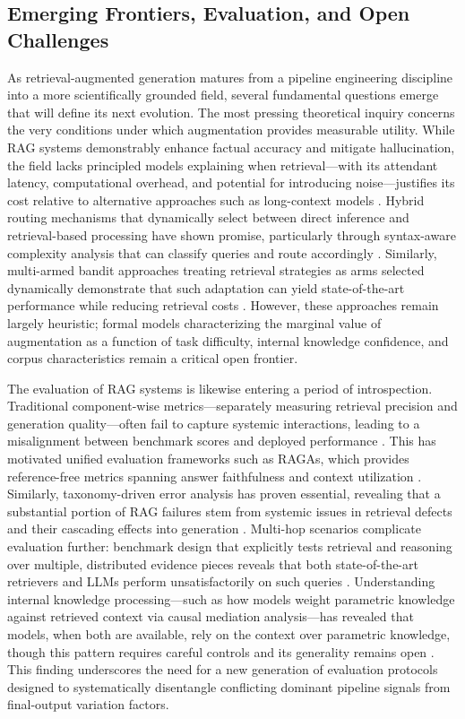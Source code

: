 \documentclass[11pt,a4paper]{article}
\begin{document}
\subsection{Emerging Frontiers, Evaluation, and Open Challenges}


As retrieval-augmented generation matures from a pipeline engineering discipline into a more scientifically grounded field, several fundamental questions emerge that will define its next evolution. The most pressing theoretical inquiry concerns the very conditions under which augmentation provides measurable utility. While RAG systems demonstrably enhance factual accuracy and mitigate hallucination, the field lacks principled models explaining when retrieval---with its attendant latency, computational overhead, and potential for introducing noise---justifies its cost relative to alternative approaches such as long-context models \cite{arxiv:2312.10997v5}. Hybrid routing mechanisms that dynamically select between direct inference and retrieval-based processing have shown promise, particularly through syntax-aware complexity analysis that can classify queries and route accordingly \cite{arxiv:2602.03578v1}. Similarly, multi-armed bandit approaches treating retrieval strategies as arms selected dynamically demonstrate that such adaptation can yield state-of-the-art performance while reducing retrieval costs \cite{arxiv:2412.01572v4}. However, these approaches remain largely heuristic; formal models characterizing the marginal value of augmentation as a function of task difficulty, internal knowledge confidence, and corpus characteristics remain a critical open frontier.

The evaluation of RAG systems is likewise entering a period of introspection. Traditional component-wise metrics---separately measuring retrieval precision and generation quality---often fail to capture systemic interactions, leading to a misalignment between benchmark scores and deployed performance \cite{arxiv:2506.00054v1}. This has motivated unified evaluation frameworks such as RAGAs, which provides reference-free metrics spanning answer faithfulness and context utilization \cite{arxiv:2309.15217v1}. Similarly, taxonomy-driven error analysis has proven essential, revealing that a substantial portion of RAG failures stem from systemic issues in retrieval defects and their cascading effects into generation \cite{arxiv:2510.13975v2}. Multi-hop scenarios complicate evaluation further: benchmark design that explicitly tests retrieval and reasoning over multiple, distributed evidence pieces reveals that both state-of-the-art retrievers and LLMs perform unsatisfactorily on such queries \cite{arxiv:2401.15391v1}. Understanding internal knowledge processing---such as how models weight parametric knowledge against retrieved context via causal mediation analysis---has revealed that models, when both are available, rely on the context over parametric knowledge, though this pattern requires careful controls and its generality remains open \cite{arxiv:2410.05162v1}. This finding underscores the need for a new generation of evaluation protocols designed to systematically disentangle conflicting dominant pipeline signals from final-output variation factors.
\end{document}
